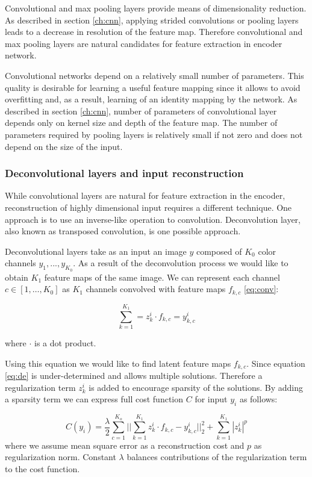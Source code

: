 Convolutional and max pooling layers provide means of dimensionality reduction.
As described in section \ref{ch:cnn}, applying strided convolutions or pooling layers leads to a decrease in resolution of the feature map.
Therefore convolutional and max pooling layers are natural candidates for feature extraction in encoder network.

Convolutional networks depend on a relatively small number of parameters.
This quality is desirable for learning a useful feature mapping since it allows to avoid overfitting and, as a result, learning of an identity mapping by the network.
As described in section \ref{ch:cnn}, number of parameters of convolutional layer depends only on kernel size and depth of the feature map.
The number of parameters required by pooling layers is relatively small if not zero and does not depend on the size of the input.

\subsubsection{Deconvolutional layers and input reconstruction}

While convolutional layers are natural for feature extraction in the encoder, reconstruction of highly dimensional input requires a different technique.
One approach is to use an inverse-like operation to convolution.
Deconvolution layer, also known as transposed convolution, is one possible approach.

Deconvolutional layers \cite{Zeiler2010} take as an input an image $y$ composed of $K_0$ color channels $y_1, ... , y_{K_0}$.
As a result of the deconvolution process we would like to obtain $K_1$ feature maps of the same image.
We can represent each channel $c \in [1, \ldots, K_0]$ as $K_1$ channels convolved with feature maps $f_{k,c}$ \ref{eq:conv}:

\begin{equation}\label{eq:de}
  \sum^{K_1}_{k=1}=z^i_k \cdot f_{k,c} = y^i_{k,c}
\end{equation}

where $\cdot$ is a dot product.

Using this equation we would like to find latent feature maps $f_{k,c}$.
Since equation \ref{eq:de} is under-determined and allows multiple solutions.
Therefore a regularization term $z^i_k$ is added to encourage sparsity of the solutions.
By adding a sparsity term we can express full cost function $C$ for input $y_i$ as follows:

\begin{equation}\label{eq:dec}
    C(y_i) = \frac{\lambda}{2} \sum^{K_o}_{c=1} ||\sum^{K_1}_{k=1}{z^i_k \cdot f_{k,c} - y^i_{k,c}}||^2_2 + \sum^{K_1}_{k=1}{|z^i_k|^p}
\end{equation}
where we assume mean square error as a reconstruction cost and $p$ as regularization norm.
Constant $\lambda$ balances contributions of the regularization term to the cost function.

